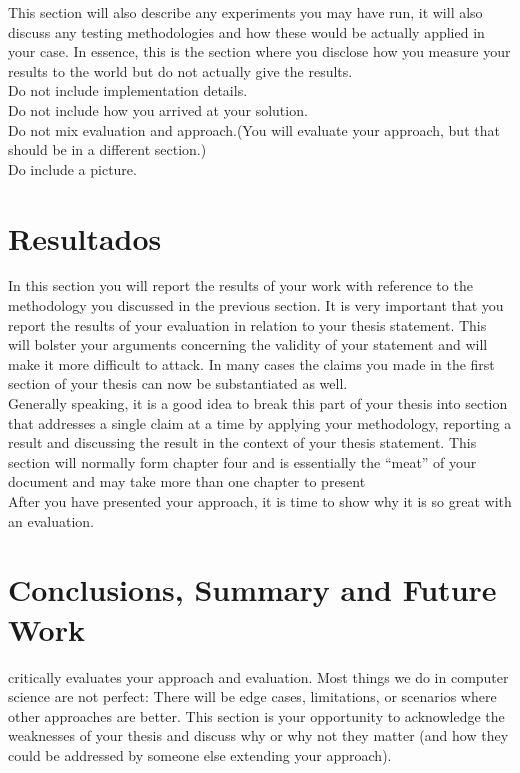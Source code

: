 \documentclass[11pt,a4paper,oldfontcommands]{memoir}
\begin{document}
\begin{multicols}{2}
This section will also describe any experiments you may have run, it will also discuss any testing methodologies and how these would be actually applied in your case. In essence, this is the section where you disclose how you measure your results to the world but do not actually give the results.
\\
Do not include implementation details.\\
Do not include how you arrived at your solution.\\
Do not mix evaluation and approach.(You will evaluate your approach, but that should be in a different section.)\\
Do include a picture.\\

\section{Resultados}
In this section you will report the results of your work with reference to the methodology
you discussed in the previous section. It is very important that you report the results of
your evaluation in relation to your thesis statement. This will bolster your arguments
concerning the validity of your statement and will make it more difficult to attack. In
many cases the claims you made in the first section of your thesis can now be
substantiated as well.
\\

Generally speaking, it is a good idea to break this part of your thesis into section that
addresses a single claim at a time by applying your methodology, reporting a result and
discussing the result in the context of your thesis statement.
This section will normally form chapter four and is essentially the “meat” of your
document and may take more than one chapter to present
\\

After you have presented your approach, it is time to show why it is so great with an evaluation.
\section{Conclusions, Summary and Future Work}
critically evaluates your approach and evaluation. Most things we
do in computer science are not perfect: There will be edge cases, limitations, or scenarios where other approaches are better. This section is your opportunity to acknowledge the weaknesses of your thesis and discuss why or why not they matter (and how they could be addressed by someone else extending your approach).\\



% 


\end{multicols}
\end{document}
